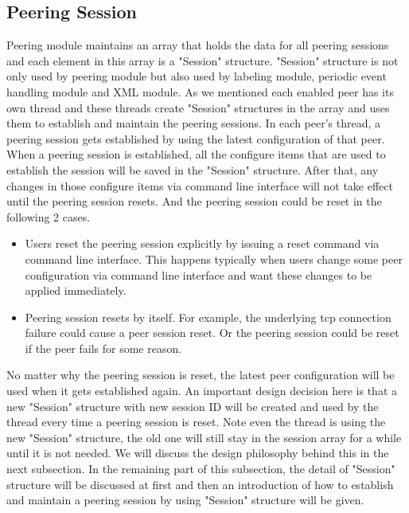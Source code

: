 \subsection{Peering  Session}
Peering module maintains an array that holds the data for all peering sessions and each element in this array is a "Session" structure. "Session" structure is not only used by peering module but also used by labeling module, periodic event handling module and XML module.
As we mentioned each enabled peer has its own thread and these threads create "Session" structures in the array and uses them to establish and maintain the peering sessions. In each peer's thread, a peering session gets established by using the latest configuration of that peer. When a peering session is established, all the configure items that are used to establish the session will be saved in the "Session" structure. After that, any changes in those configure items via command line interface will not take effect until the peering session resets. And the peering session could be reset in the following 2 cases.
\begin{itemize}
\item{Users reset the peering session explicitly by issuing a reset command via command line interface. This happens typically when users change some peer configuration via command line interface and want these changes to be applied immediately. } 
\item{Peering session resets by itself. For example, the underlying tcp connection failure could cause a peer session reset.  Or the peering session could be reset if the peer fails for some reason.   }  
\end{itemize}
No matter why the peering session is reset, the latest peer configuration will be used when it gets established again. 
An important design decision here is that a new "Session" structure with new session ID will be created and used by the thread every time a peering session is reset.  Note even the thread is using the new "Session" structure, the old one will still stay in the session array for a while until it is not needed. We will discuss the design philosophy behind this in the next subsection.
In the remaining part of this subsection, the detail of "Session" structure will be discussed at first and then an introduction of how to establish and maintain a peering session by using "Session" structure will be given.

